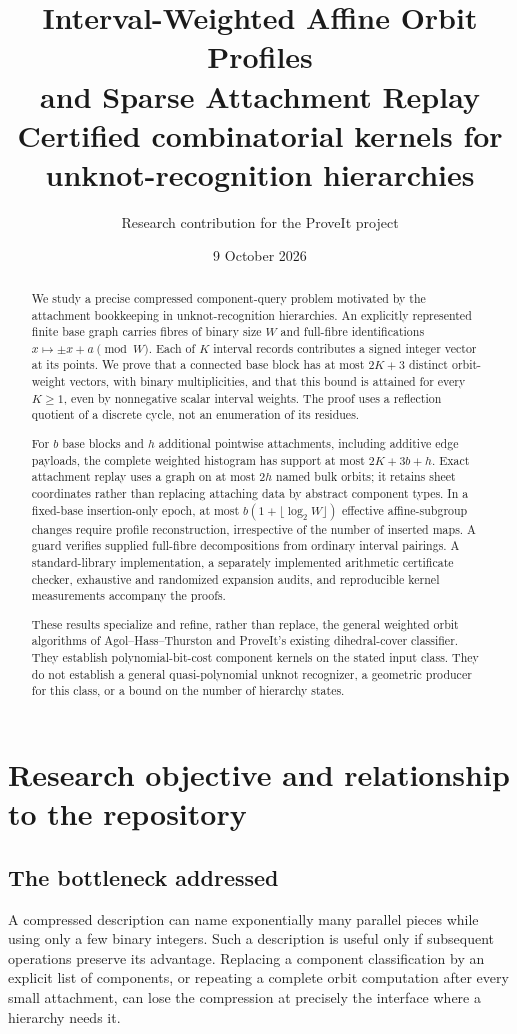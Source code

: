 \documentclass[11pt]{article}
\title{\textbf{Interval-Weighted Affine Orbit Profiles\\and Sparse Attachment Replay}\\[0.5em]
\large Certified combinatorial kernels for unknot-recognition hierarchies}
\author{Research contribution for the ProveIt project}
\date{9 October 2026}
\theoremstyle{definition}
\begin{document}
\maketitle
\begin{abstract}
We study a precise compressed component-query problem motivated by the attachment bookkeeping in unknot-recognition hierarchies. An explicitly represented finite base graph carries fibres of binary size $W$ and full-fibre identifications $x\mapsto\pm x+a\pmod W$. Each of $K$ interval records contributes a signed integer vector at its points. We prove that a connected base block has at most $2K+3$ distinct orbit-weight vectors, with binary multiplicities, and that this bound is attained for every $K\ge1$, even by nonnegative scalar interval weights. The proof uses a reflection quotient of a discrete cycle, not an enumeration of its residues.

For $b$ base blocks and $h$ additional pointwise attachments, including additive edge payloads, the complete weighted histogram has support at most $2K+3b+h$. Exact attachment replay uses a graph on at most $2h$ named bulk orbits; it retains sheet coordinates rather than replacing attaching data by abstract component types. In a fixed-base insertion-only epoch, at most $b(1+\lfloor\log_2W\rfloor)$ effective affine-subgroup changes require profile reconstruction, irrespective of the number of inserted maps. A guard verifies supplied full-fibre decompositions from ordinary interval pairings. A standard-library implementation, a separately implemented arithmetic certificate checker, exhaustive and randomized expansion audits, and reproducible kernel measurements accompany the proofs.

These results specialize and refine, rather than replace, the general weighted orbit algorithms of Agol--Hass--Thurston and ProveIt's existing dihedral-cover classifier. They establish polynomial-bit-cost component kernels on the stated input class. They do not establish a general quasi-polynomial unknot recognizer, a geometric producer for this class, or a bound on the number of hierarchy states.
\end{abstract}
\thispagestyle{empty}
\newpage
\tableofcontents
\newpage

\section{Research objective and relationship to the repository}
\label{sec:scope}

\subsection{The bottleneck addressed}
A compressed description can name exponentially many parallel pieces while using only a few binary integers. Such a description is useful only if subsequent operations preserve its advantage. Replacing a component classification by an explicit list of components, or repeating a complete orbit computation after every small attachment, can lose the compression at precisely the interface where a hierarchy needs it.
\end{document}
